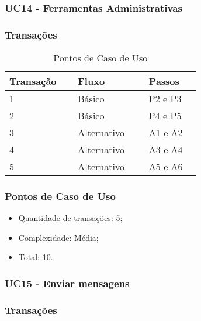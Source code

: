 \subsubsection{UC14 - Ferramentas Administrativas}

\subsubsection{Transações}

\begin{table*}[!h]
\centering
\caption{Pontos de Caso de Uso}
\label{Rotulo}
  \begin{tabular}{|p{0.20\linewidth}|p{0.25\linewidth}|p{0.20\linewidth}|}
  \hline
  \textbf{Transação} & \textbf{Fluxo} & \textbf{Passos} \\ 
  \hline
  1 & Básico & P2 e P3\\
  \hline
  2 & Básico & P4 e P5\\
  \hline
  3 & Alternativo & A1 e A2\\
  \hline
  4 & Alternativo & A3 e A4\\
  \hline
  5 & Alternativo & A5 e A6\\
  \hline
  \end{tabular}
\end{table*}

\pagebreak
\subsubsection{Pontos de Caso de Uso}

\begin{itemize}
 \item Quantidade de transações: 5;
 \item Complexidade: Média;
 \item Total: 10.
\end{itemize}

\vfill

\subsubsection{UC15 - Enviar mensagens}

\subsubsection{Transações}

